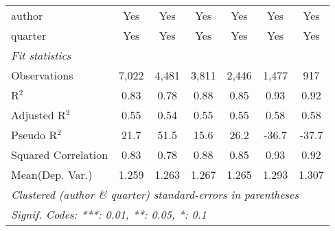 \begin{tabular}{lcccccc}
   author                                                     & Yes          & Yes           & Yes           & Yes          & Yes           & Yes\\  
   quarter                                                    & Yes          & Yes           & Yes           & Yes          & Yes           & Yes\\  
   \midrule
   \emph{Fit statistics}\\
   Observations                                               & 7,022        & 4,481         & 3,811         & 2,446        & 1,477         & 917\\  
   R$^2$                                                      & 0.83         & 0.78          & 0.88          & 0.85         & 0.93          & 0.92\\  
   Adjusted R$^2$                                             & 0.55         & 0.54          & 0.55          & 0.55         & 0.58          & 0.58\\  
   Pseudo R$^2$                                               & 21.7         & 51.5          & 15.6          & 26.2         & -36.7         & -37.7\\  
   Squared Correlation                                        & 0.83         & 0.78          & 0.88          & 0.85         & 0.93          & 0.92\\  
Mean(Dep. Var.) & 1.259 & 1.263 & 1.267 & 1.265 & 1.293 & 1.307 \\
   \midrule \midrule
   \multicolumn{7}{l}{\emph{Clustered (author \& quarter) standard-errors in parentheses}}\\
   \multicolumn{7}{l}{\emph{Signif. Codes: ***: 0.01, **: 0.05, *: 0.1}}\\
\end{tabular}
\par\endgroup
